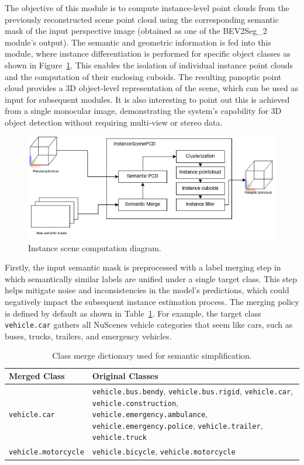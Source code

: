 The objective of this module is to compute instance-level point clouds from the previously reconstructed scene point cloud using the corresponding semantic mask of the input perspective image (obtained as one of the BEV2Seg\_2 module's output). The semantic and geometric information is fed into this module, where instance differentiation is performed for specific object classes as shown in Figure~\ref{fig:instance_scene_diagram}. This enables the isolation of individual instance point clouds and the computation of their enclosing cuboids. The resulting panoptic point cloud provides a 3D object-level representation of the scene, which can be used as input for subsequent modules. It is also interesting to point out this is achieved from a single monocular image, demonstrating the system's capability for 3D object detection without requiring multi-view or stereo data.

\begin{figure}[h!]
    \centering
    \includegraphics[width=0.5\linewidth]{images/methodology/instance_scene_flow_diagram.png}
    \caption{Instance scene computation diagram.}
    \label{fig:instance_scene_diagram}
\end{figure}

Firstly, the input semantic mask is preprocessed with a label merging step in which semantically similar labels are unified under a single target class. This step helps mitigate noise and inconsistencies in the model's predictions, which could negatively impact the subsequent instance estimation process. The merging policy is defined by default as shown in Table~\ref{tab:merge_dict}. For example, the target class \texttt{vehicle.car} gathers all NuScenes vehicle categories that seem like cars, such as buses, trucks, trailers, and emergency vehicles.

\begin{table}[h!]
    \centering
    \small
    \begin{tabular}{|l|p{10cm}|}
        \hline
        \textbf{Merged Class} & \textbf{Original Classes} \\
        \hline
        \texttt{vehicle.car} & 
        \texttt{vehicle.bus.bendy}, \texttt{vehicle.bus.rigid}, \texttt{vehicle.car}, \texttt{vehicle.construction}, \texttt{vehicle.emergency.ambulance}, \texttt{vehicle.emergency.police}, \texttt{vehicle.trailer}, \texttt{vehicle.truck} \\
        \hline
        \texttt{vehicle.motorcycle} & 
        \texttt{vehicle.bicycle}, \texttt{vehicle.motorcycle} \\
        \hline
    \end{tabular}
    \caption{Class merge dictionary used for semantic simplification.}
    \label{tab:merge_dict}
\end{table}

